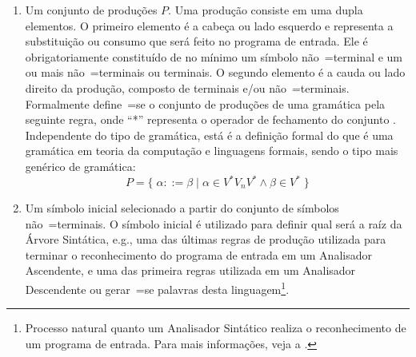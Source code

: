 \begin{enumerate}
    \item \label{definicaoDeGramatica}Um conjunto de produções $P$.
    Uma produção consiste em uma dupla elementos.
    O primeiro elemento é a cabeça ou
    lado esquerdo e
    representa a substituição ou
    consumo que será feito no programa de entrada.
    Ele é obrigatoriamente constituído de no mínimo um símbolo não~=terminal e
    um ou mais não~=terminais ou
    terminais.
    O segundo elemento é a cauda ou
    lado direito da produção,
    composto de terminais e\slash{}ou não~=terminais.
    Formalmente define~=se o conjunto de produções de uma gramática pela seguinte regra,
    onde ``*'' representa o operador de fechamento do conjunto \cite{hopcroftBook}.
    Independente do tipo de gramática,
    está é a definição formal do que é uma gramática em teoria da computação e
    linguagens formais,
    sendo o tipo mais genérico de gramática:
    $$P = \{\; \alpha ::= \beta \;|\; \alpha \in V^* V_n V^* \land \beta \in V^* \;\}$$

    \item Um símbolo inicial selecionado a partir do conjunto de símbolos não~=terminais.
    O símbolo inicial é utilizado para definir qual será a raíz da Árvore Sintática,
    e.g.,
    uma das últimas regras de produção utilizada para terminar o reconhecimento do programa de entrada em um Analisador Ascendente,
    e uma das primeira regras utilizada em um Analisador Descendente ou
    gerar~=se palavras desta linguagem\footnote{
    Processo natural quanto um Analisador Sintático realiza o reconhecimento de um programa de entrada.
    Para mais informações,
    veja a .
    }.
\end{enumerate}

